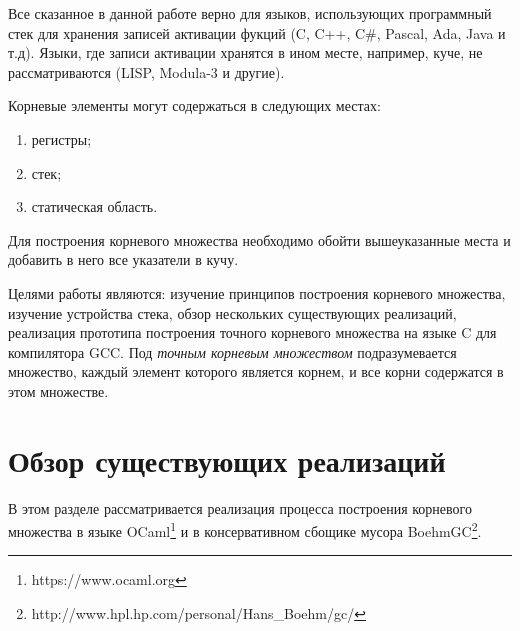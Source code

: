 Все сказанное в данной работе верно для языков, использующих программный стек для хранения записей активации фукций (C, C++, C\#, Pascal, Ada, Java и т.д).
Языки, где записи активации хранятся в ином месте, например, куче, не рассматриваются (LISP, Modula-3 и другие).

Корневые элементы могут содержаться в следующих местах:
\begin{enumerate}
\item регистры;
\item стек;
\item статическая область.
\end{enumerate}

Для построения корневого множества необходимо обойти вышеуказанные места и добавить в него все указатели в кучу.

Целями работы являются: изучение принципов построения корневого множества, изучение устройства стека, обзор нескольких существующих реализаций, 
реализация прототипа построения точного корневого множества на языке C для компилятора GCC. Под \emph{точным корневым множеством} подразумевается множество, 
каждый элемент которого является корнем, и все корни содержатся в этом множестве.

\section{Обзор существующих реализаций}

В этом разделе рассматривается реализация процесса построения корневого множества в языке OCaml\footnote{https://www.ocaml.org} и в 
консервативном сбощике мусора BoehmGC\footnote{http://www.hpl.hp.com/personal/Hans\_Boehm/gc/}.

